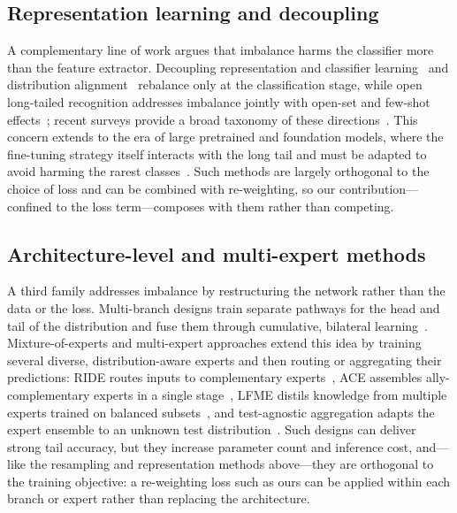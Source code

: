 \documentclass[a4paper,fleqn]{cas-sc}
\begin{document}
\subsection{Representation learning and decoupling}
A complementary line of work argues that imbalance harms the classifier more
than the feature extractor. Decoupling representation and classifier
learning~\citep{kang2020} and distribution alignment~\citep{zhang2021} rebalance
only at the classification stage, while open long-tailed recognition addresses
imbalance jointly with open-set and few-shot effects~\citep{liu2019}; recent
surveys provide a broad taxonomy of these directions~\citep{zhang2023}. This concern
extends to the era of large pretrained and foundation models, where the
fine-tuning strategy itself interacts with the long tail and must be adapted to
avoid harming the rarest classes~\citep{shi2024}. Such methods are largely
orthogonal to the choice of loss and can be combined with re-weighting, so our
contribution---confined to the loss term---composes with them rather than
competing.

\subsection{Architecture-level and multi-expert methods}
A third family addresses imbalance by restructuring the network rather than the
data or the loss. Multi-branch designs train separate pathways for the head and
tail of the distribution and fuse them through cumulative, bilateral
learning~\citep{zhou2020}. Mixture-of-experts and multi-expert approaches extend
this idea by training several diverse, distribution-aware experts and then
routing or aggregating their predictions: RIDE routes inputs to complementary
experts~\citep{wang2021}, ACE assembles ally-complementary experts in a single
stage~\citep{cai2021}, LFME distils knowledge from multiple experts trained on
balanced subsets~\citep{xiang2020}, and test-agnostic aggregation adapts the
expert ensemble to an unknown test distribution~\citep{zhang2022}. Such designs
can deliver strong tail accuracy, but they increase parameter count and inference
cost, and---like the resampling and representation methods above---they are
orthogonal to the training objective: a re-weighting loss such as ours can be
applied within each branch or expert rather than replacing the architecture.
\end{document}

